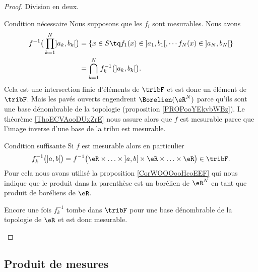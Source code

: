 \begin{proof}
    Division en deux.
    \begin{subproof}
    \item[Condition nécessaire]
        Nous supposons que les \( f_i\) sont mesurables. Nous avons
        \begin{subequations}
            \begin{align}
            f^{-1}\big( \prod_{k=1}^N\mathopen] a_k , b_k \mathclose[ \big)&=\{ x\in S\tq f_1(x)\in\mathopen] a_1 , b_1 \mathclose[ ,\cdots f_N(x)\in\mathopen] a_N , b_N \mathclose[\}\\
            &=\bigcap_{k=1}^Nf_k^{-1}\big( \mathopen] a_k , b_k \mathclose[ \big).
            \end{align}
        \end{subequations}
        Cela est une intersection finie d'éléments de \( \tribF\) et est donc un élément de \( \tribF\). Mais les pavés ouverts engendrent \( \Borelien(\eR^N)\) parce qu'ils sont une base dénombrable de la topologie (proposition \ref{PROPooYEkvbWBz}). Le théorème \ref{ThoECVAooDUxZrE} nous assure alors que \( f\) est mesurable parce que l'image inverse d'une base de la tribu est mesurable.
    \item[Condition suffisante]
        Si \( f\) est mesurable alors en particulier
        \begin{equation}
            f_k^{-1}\big( \mathopen] a , b \mathclose[ \big)=f^{-1}\big( \eR\times\ldots\times \mathopen] a , b \mathclose[\times \eR\times\ldots\times \eR \big)\in\tribF.
        \end{equation}
        Pour cela nous avons utilisé la proposition \ref{CorWOOOooHcoEEF} qui nous indique que le produit dans la parenthèse est un borélien de \( \eR^N\) en tant que produit de boréliens de \( \eR\).

        Encore une fois \( f_k^{-1}\) tombe dans \( \tribF\) pour une base dénombrable de la topologie de \( \eR\) et est donc mesurable.
    \end{subproof}
\end{proof}

\subsection{Produit de mesures}

